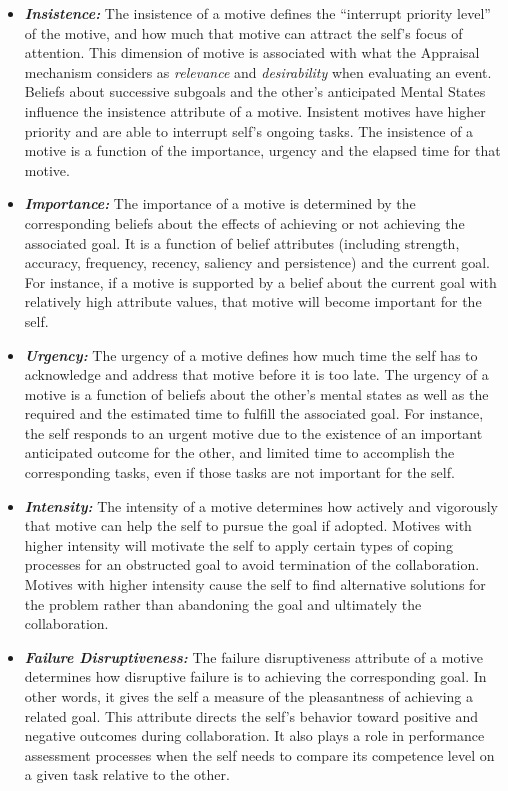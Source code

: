 \documentclass[12pt]{report}
\begin{document}
\begin{itemize}
  \item \textbf{\textit{Insistence:}} The insistence of a motive defines the
  ``interrupt priority level'' of the motive, and how much that motive can
  attract the self's focus of attention. This dimension of motive is associated
  with what the Appraisal mechanism considers as \emph{relevance} and
  \emph{desirability} when evaluating an event. Beliefs about successive
  subgoals and the other's anticipated Mental States influence the insistence
  attribute of a motive. Insistent motives have higher priority and are able to
  interrupt self's ongoing tasks. The insistence of a motive is a function of
  the importance, urgency and the elapsed time for that motive.
  
  \item \textbf{\textit{Importance:}} The importance of a motive is determined
  by the corresponding beliefs about the effects of achieving or not achieving
  the associated goal. It is a function of belief attributes (including
  strength, accuracy, frequency, recency, saliency and persistence) and the
  current goal. For instance, if a motive is supported by a belief about the
  current goal with relatively high attribute values, that motive will become
  important for the self.
  
  \item \textbf{\textit{Urgency:}} The urgency of a motive defines how much time
  the self has to acknowledge and address that motive before it is too late.
  The urgency of a motive is a function of beliefs about the other's mental
  states as well as the required and the estimated time to fulfill the
  associated goal. For instance, the self responds to an urgent motive due to
  the existence of an important anticipated outcome for the other, and limited
  time to accomplish the corresponding tasks, even if those tasks are not
  important for the self.
  
  \item \textbf{\textit{Intensity:}} The intensity of a motive determines how
  actively and vigorously that motive can help the self to pursue the goal if
  adopted. Motives with higher intensity will motivate the self to apply
  certain types of coping processes for an obstructed goal to avoid termination
  of the collaboration. Motives with higher intensity cause the self to find
  alternative solutions for the problem rather than abandoning the goal and
  ultimately the collaboration.
  
  \item \textbf{\textit{Failure Disruptiveness:}} The failure disruptiveness
  attribute of a motive determines how disruptive failure is to achieving the
  corresponding goal. In other words, it gives the self a measure of the
  pleasantness of achieving a related goal. This attribute directs the self's
  behavior toward positive and negative outcomes during collaboration. It also
  plays a role in performance assessment processes when the self needs to
  compare its competence level on a given task relative to the other.
\end{itemize}
\end{document}
